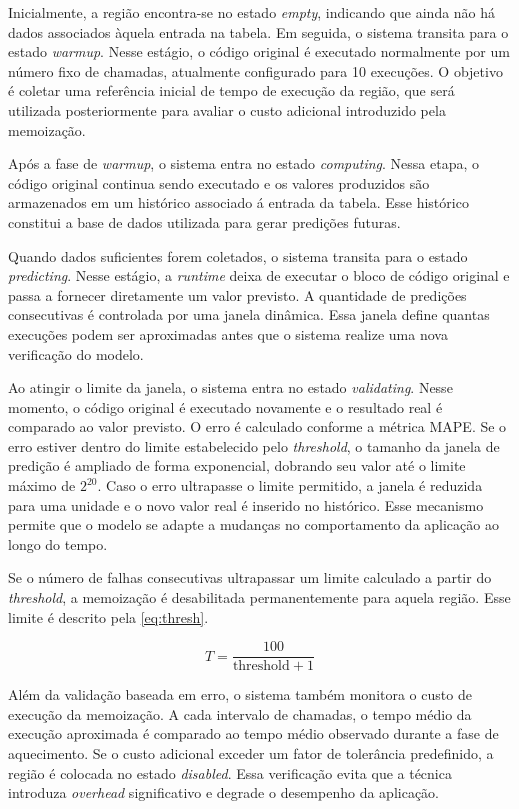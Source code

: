 Inicialmente, a região encontra-se no estado \textit{empty}, indicando que ainda não há dados associados àquela entrada na tabela. Em seguida, o sistema transita para o estado \textit{warmup}. Nesse estágio, o código original é executado normalmente por um número fixo de chamadas, atualmente configurado para 10 execuções. O objetivo é coletar uma referência inicial de tempo de execução da região, que será utilizada posteriormente para avaliar o custo adicional introduzido pela memoização.

Após a fase de \textit{warmup}, o sistema entra no estado \textit{computing}. Nessa etapa, o código original continua sendo executado e os valores produzidos são armazenados em um histórico associado á entrada da tabela. Esse histórico constitui a base de dados utilizada para gerar predições futuras.

Quando dados suficientes forem coletados, o sistema transita para o estado \textit{predicting}. Nesse estágio, a \textit{runtime} deixa de executar o bloco de código original e passa a fornecer diretamente um valor previsto. A quantidade de predições consecutivas é controlada por uma janela dinâmica. Essa janela define quantas execuções podem ser aproximadas antes que o sistema realize uma nova verificação do modelo.

Ao atingir o limite da janela, o sistema entra no estado \textit{validating}. Nesse momento, o código original é executado novamente e o resultado real é comparado ao valor previsto. O erro é calculado conforme a métrica MAPE. Se o erro estiver dentro do limite estabelecido pelo \textit{threshold}, o tamanho da janela de predição é ampliado de forma exponencial, dobrando seu valor até o limite máximo de $2^{20}$. Caso o erro ultrapasse o limite permitido, a janela é reduzida para uma unidade e o novo valor real é inserido no histórico. Esse mecanismo permite que o modelo se adapte a mudanças no comportamento da aplicação ao longo do tempo.

Se o número de falhas consecutivas ultrapassar um limite calculado a partir do \textit{threshold}, a memoização é desabilitada permanentemente para aquela região. Esse limite é descrito pela \autoref{eq:thresh}.

\begin{equation}
    T = \frac{100}{\text{threshold} + 1}
    \label{eq:thresh}
\end{equation}

Além da validação baseada em erro, o sistema também monitora o custo de execução da memoização. A cada intervalo de chamadas, o tempo médio da execução aproximada é comparado ao tempo médio observado durante a fase de aquecimento. Se o custo adicional exceder um fator de tolerância predefinido, a região é colocada no estado \textit{disabled}. Essa verificação evita que a técnica introduza \textit{overhead} significativo e degrade o desempenho da aplicação.

